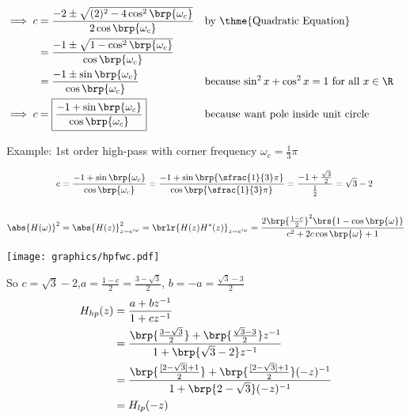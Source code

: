 {\begin{align*}
  \\\implies c &= \frac{-2 \pm \sqrt{(2)^2 -4\cos^2\brp{\omega_c}}}
                       {2\cos\brp{\omega_c}}
               && \text{by \thme{Quadratic Equation}}
             \\&= \frac{-1 \pm \sqrt{1 -\cos^2\brp{\omega_c}}}
                       {\cos\brp{\omega_c}}
             \\&= \frac{-1 \pm \sin\brp{\omega_c}}
                       {\cos\brp{\omega_c}}
               && \text{because $\sin^2x + \cos^2x = 1$ for all $x\in\R$}
  \\\implies c &=
      \boxed{\frac{-1 + \sin\brp{\omega_c}}
                    {\cos\brp{\omega_c}}}
               && \text{because want pole inside unit circle}
\end{align*}}




Example: 1st order high-pass with corner frequency $\omega_c=\frac{1}{3}\pi$

{\begin{align*}
  c &= \frac{-1 + \sin\brp{\omega_c}}{\cos\brp{\omega_c}}
     = \frac{-1 + \sin\brp{\sfrac{1}{3}\pi}}{\cos\brp{\sfrac{1}{3}\pi}}
     = \frac{-1 + \frac{\sqrt{3}}{2}}{\frac{1}{2}}
     = \sqrt{3} - 2
  \\
  \\
  \abs{H(\omega)}^2
    &= \abs{H(z)}^2_{z=e^{i\omega}}
     = \brlr{H(z)H^\ast(z)}_{z=e^{i\omega}}
     = \frac{2\brp{\frac{1-c}{2}}^2\brs{1 -  \cos\brp{\omega}}}
            {c^2 + 2 c\cos\brp{\omega} + 1}
\end{align*}}

\texttt{[image: graphics/hpfwc.pdf]}




So $c=\sqrt{3}-2$,\qquad $a=\frac{1-c}{2}=\frac{3-\sqrt{3}}{2}$, \qquad $b=-a=\frac{\sqrt{3}-3}{2}$
\begin{align*}
  H_{hp}(z)
    &= \frac{a + bz^{-1}}{1+cz^{-1}}
  \\&= \frac{\brp{\frac{3-\sqrt{3}}{2}} + \brp{\frac{\sqrt{3}-3}{2}}z^{-1}}
            {1+\brp{\sqrt{3}-2}z^{-1}}
  \\&= \frac{\brp{\frac{[2-\sqrt{3}]+1}{2}} + \brp{\frac{[2-\sqrt{3}]+1}{2}}(-z)^{-1}}
            {1+\brp{2-\sqrt{3}}(-z)^{-1}}
  \\&= H_{lp}(-z)
\end{align*}










